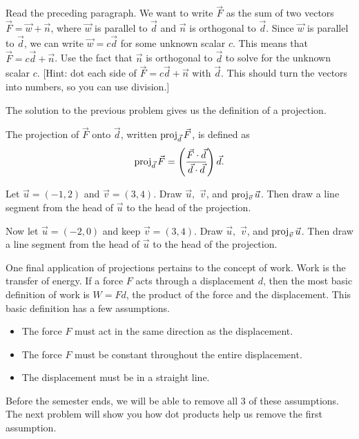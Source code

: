 \begin{problem}\label{force intro}
Read the preceding paragraph. We want to write $\vec F$ as the sum of two vectors $\vec F = \vec w+\vec n$, where $\vec w$ is parallel to $\vec d$ and $\vec n$ is orthogonal to $\vec d$.
Since $\vec w$ is parallel to $\vec d$, we can write $\vec w=c\vec d$ for some unknown scalar $c$.
This means that $\vec F=c\vec d+\vec n$.  Use the fact that $\vec n$ is orthogonal to $\vec d$ to solve for the unknown scalar $c$.  [Hint:  dot each side of $\vec F=c\vec d+\vec n$ with $\vec d$. This should turn the vectors into numbers, so you can use division.]
\end{problem}
The solution to the previous problem gives us the definition of a projection.
\begin{definition}
The projection of $\vec F$ onto $\vec d$, written $\operatorname{proj}_{\vec d}\vec F$, is defined as $$\operatorname{proj}_{\vec d}\vec F = \left(\frac{\vec F\cdot \vec d}{\vec d\cdot \vec d}\right)\vec d.$$
\end{definition}

\begin{problem} 
Let $\vec u=(-1,2)$ and $\vec v=(3,4)$. Draw $\vec u,$ $\vec v$, and $\operatorname{proj}_{\vec v}\vec u$. Then draw a line segment from the head of $\vec u$ to the head of the projection.

Now let $\vec u=(-2,0)$ and keep $\vec v=(3,4)$. Draw $\vec u,$ $\vec v$, and $\operatorname{proj}_{\vec v}\vec u$. Then draw a line segment from the head of $\vec u$ to the head of the projection.

\end{problem}

One final application of projections pertains to the concept of work. Work is the transfer of energy. If a force $F$ acts through a displacement $d$, then the most basic definition of work is $W=Fd$, the product of the force and the displacement.  This basic definition has a few assumptions.
\begin{itemize}
\item The force $F$ must act in the same direction as the displacement.
\item The force $F$ must be constant throughout the entire displacement.
\item The displacement must be in a straight line.
\end{itemize}
Before the semester ends, we will be able to remove all 3 of these assumptions.  The next problem will show you how dot products help us remove the first assumption.

